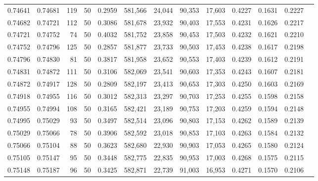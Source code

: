 \begin{tabular}{rrrrrrrrrrrrr}
0.74641 & 0.74681 &   119 &  50 &                                     0.2959 & 581,566 &  24,044 &  90,353 &  17,603 & 0.4227 & 0.1631 & 0.2227 \\
0.74682 & 0.74721 &   112 &  50 &                                     0.3086 & 581,678 &  23,932 &  90,403 &  17,553 & 0.4231 & 0.1626 & 0.2217 \\
0.74721 & 0.74752 &    74 &  50 &                                     0.4032 & 581,752 &  23,858 &  90,453 &  17,503 & 0.4232 & 0.1621 & 0.2210 \\
0.74752 & 0.74796 &   125 &  50 &                                     0.2857 & 581,877 &  23,733 &  90,503 &  17,453 & 0.4238 & 0.1617 & 0.2198 \\
0.74796 & 0.74830 &    81 &  50 &                                     0.3817 & 581,958 &  23,652 &  90,553 &  17,403 & 0.4239 & 0.1612 & 0.2191 \\
0.74831 & 0.74872 &   111 &  50 &                                     0.3106 & 582,069 &  23,541 &  90,603 &  17,353 & 0.4243 & 0.1607 & 0.2181 \\
0.74872 & 0.74917 &   128 &  50 &                                     0.2809 & 582,197 &  23,413 &  90,653 &  17,303 & 0.4250 & 0.1603 & 0.2169 \\
0.74918 & 0.74955 &   116 &  50 &                                     0.3012 & 582,313 &  23,297 &  90,703 &  17,253 & 0.4255 & 0.1598 & 0.2158 \\
0.74955 & 0.74994 &   108 &  50 &                                     0.3165 & 582,421 &  23,189 &  90,753 &  17,203 & 0.4259 & 0.1594 & 0.2148 \\
0.74995 & 0.75029 &    93 &  50 &                                     0.3497 & 582,514 &  23,096 &  90,803 &  17,153 & 0.4262 & 0.1589 & 0.2139 \\
0.75029 & 0.75066 &    78 &  50 &                                     0.3906 & 582,592 &  23,018 &  90,853 &  17,103 & 0.4263 & 0.1584 & 0.2132 \\
0.75066 & 0.75104 &    88 &  50 &                                     0.3623 & 582,680 &  22,930 &  90,903 &  17,053 & 0.4265 & 0.1580 & 0.2124 \\
0.75105 & 0.75147 &    95 &  50 &                                     0.3448 & 582,775 &  22,835 &  90,953 &  17,003 & 0.4268 & 0.1575 & 0.2115 \\
0.75148 & 0.75187 &    96 &  50 &                                     0.3425 & 582,871 &  22,739 &  91,003 &  16,953 & 0.4271 & 0.1570 & 0.2106 \\

\end{tabular}
